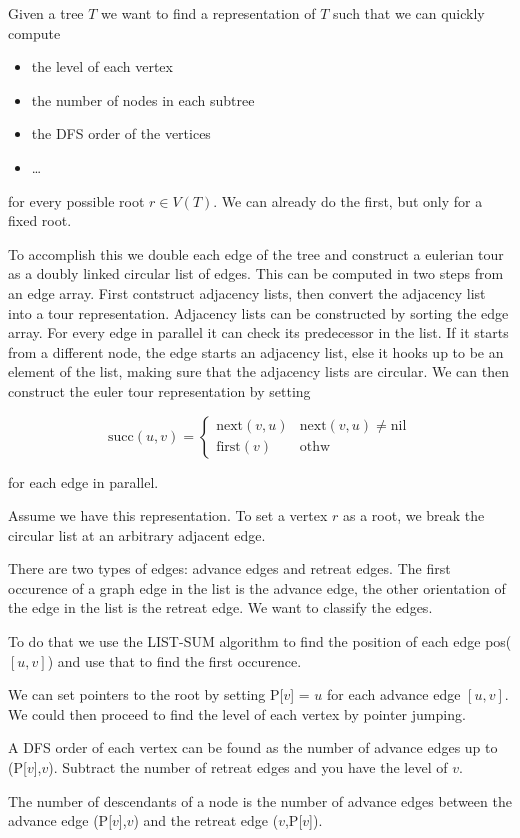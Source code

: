 Given a tree $T$ we want to find a representation of $T$ such that we can quickly compute 

\begin{itemize}
\item the level of each vertex
\item the number of nodes in each subtree
\item the DFS order of the vertices
\item \ldots
\end{itemize}

for every possible root $r\in V(T)$. We can already do the first, but only for a fixed root.

To accomplish this we double each edge of the tree and construct a eulerian tour as a doubly linked circular list of edges. This can be computed in two steps from an edge array. First contstruct adjacency lists, then convert the adjacency list into a tour representation. Adjacency lists can be constructed by sorting the edge array. For every edge in parallel it can check its predecessor in the list. If it starts from a different node, the edge starts an adjacency list, else it hooks up to be an element of the list, making sure that the adjacency lists are circular. We can then construct the euler tour representation by setting

\[\text{succ}(u,v) = \begin{cases} \text{next}(v,u) & \text{next}(v,u)\neq \text{nil}\\ \text{first}(v) & \text{othw}\end{cases}\]

for each edge in parallel.

Assume we have this representation. To set a vertex $r$ as a root, we break the circular list at an arbitrary adjacent edge.

There are two types of edges: advance edges and retreat edges. The first occurence of a graph edge in the list is the advance edge, the other orientation of the edge in the list is the retreat edge. We want to classify the edges.

To do that we use the LIST-SUM algorithm to find the position of each edge pos($[u,v]$) and use that to find the first occurence.

We can set pointers to the root by setting P[$v$] = $u$ for each advance edge $[u,v]$. We could then proceed to find the level of each vertex by pointer jumping. 

A DFS order of each vertex can be found as the number of advance edges up to (P[$v$],$v$). Subtract the number of retreat edges and you have the level of $v$.

The number of descendants of a node is the number of advance edges between the advance edge (P[$v$],$v$) and the retreat edge ($v$,P[$v$]).



